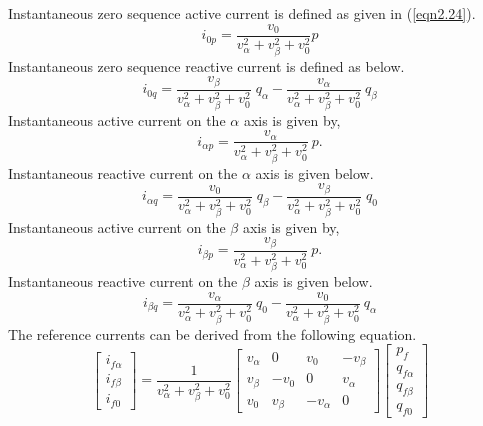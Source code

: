 Instantaneous zero sequence active current is defined as given in (\ref{eqn2.24}).
\begin{equation}
i_{0p} = \frac{v_0}{v_\alpha^2 + v_\beta^2 + v_0^2} p
\label{eqn2.24}
\end{equation}
Instantaneous zero sequence reactive current is defined as below.
\begin{equation}
i_{0q} = \frac{v_\beta}{v_\alpha^2 + v_\beta^2 + v_0^2}\; q_\alpha - \frac{v_\alpha}{v_\alpha^2 + v_\beta^2 + v_0^2} \:q_\beta
\label{eqn2.25}
\end{equation}
Instantaneous active current on the $\alpha$ axis is given by,
\begin{equation}
i_{\alpha p} = \frac{v_\alpha}{v_\alpha^2 + v_\beta^2 + v_0^2} \:p.
\label{eqn2.26}
\end{equation}
Instantaneous reactive current on the $\alpha$ axis is given below.
\begin{equation}
i_{\alpha q} = \frac{v_0}{v_\alpha^2 + v_\beta^2 + v_0^2}\; q_\beta - \frac{v_\beta}{v_\alpha^2 + v_\beta^2 + v_0^2}\; q_0
\label{eqn2.27}
\end{equation}
Instantaneous active current on the $\beta$ axis is given by,
\begin{equation}
i_{\beta p} = \frac{v_\beta}{v_\alpha^2 + v_\beta^2 + v_0^2}\: p.
\label{eqn2.28}
\end{equation}
Instantaneous reactive current on the $\beta$ axis is given below.
\begin{equation}
i_{\beta q} = \frac{v_\alpha}{v_\alpha^2 + v_\beta^2 + v_0^2}\: q_0 - \frac{v_0}{v_\alpha^2 + v_\beta^2 + v_0^2}\: q_\alpha
\label{eqn2.29}
\end{equation}
The reference currents can be derived from the following equation. 
  \begin{equation}
\begin{bmatrix} i_{f \alpha} \\ i_{ f \beta} \\ i_{ f 0}
\end{bmatrix}  = \frac{1}{v_\alpha^2 + v_\beta^2 + v_0^2} \begin{bmatrix} v_\alpha & 0 & v_0 & -v_\beta \\ v_\beta & -v_0 & 0 & v_\alpha \\ v_0 & v_\beta & -v_\alpha & 0  
\end{bmatrix} \begin{bmatrix} p_f \\ q_{f \alpha} \\ q_{f \beta} \\ q_{f 0}
 \end{bmatrix}
\label{eqn2.30}
\end{equation}
